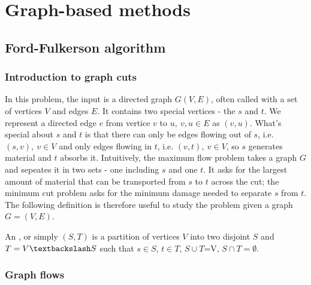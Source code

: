 \documentclass[a4paper]{article}
\begin{document}
\section{Graph-based methods}

\subsection{Ford-Fulkerson algorithm}


\subsubsection{Introduction to graph cuts}

In this problem, the input is a directed graph $G(V,E)$, often called  with a set of vertices $V$ and edges $E$. It contains two special vertices - the  $s$ and  $t$. We represent a directed edge $e$ from vertice $v$ to $u,\ v,u \in E$ as $(v,u)$. What's special about $s$ and $t$ is that there can only be edges flowing out of $s$, i.e. $(s,v), \ v \in V$ and only edges flowing in $t$, i.e. $(v,t),\ v \in V$, so $s$ generates material and $t$ absorbs it. Intuitively, the maximum flow problem takes a graph $G$ and sepeates it in two sets - one including $s$ and one $t$. It asks for the largest amount of material that can be transported from $s$ to $t$ across the cut; the minimum cut problem asks for the minimum damage needed to separate $s$ from $t$.\\
The following definition is therefore useful to study the problem given a graph $G=(V,E)$.
\begin{definition}
An , or simply  $(S,T)$ is a partition of vertices $V$ into two disjoint $S$ and $T=V \textbackslash S$ such that $s\in S$, $t \in T$, $S\cup T$=V, $S \cap T = \emptyset$.
\end{definition}



\subsubsection{Graph flows}
\end{document}
